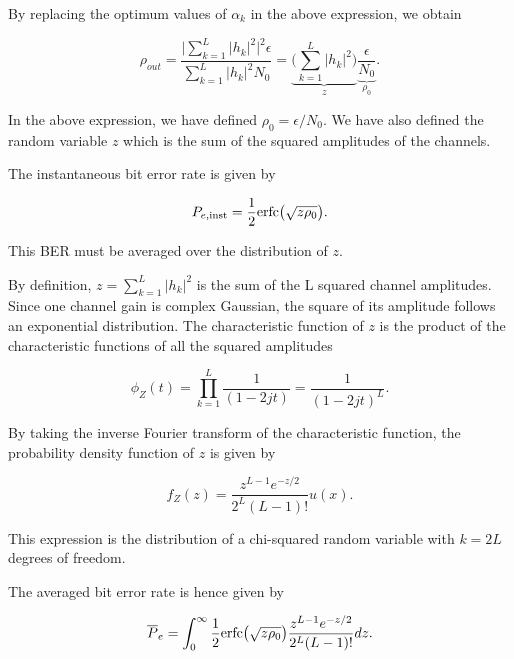 \documentclass [a4paper, 11pt] {article}
\begin{document}
\begin{solution}
\begin{enumerate}
    By replacing the optimum values of $\alpha_k$ in the above expression, we obtain

        \begin{equation}
        \rho_{out} = \dfrac{\Big| \sum_{k=1}^{L}|h_k|^2 \Big|^2 \epsilon}{\sum_{k=1}^{L} |h_k|^2N_0} = \underbrace{\bigg( \sum_{k=1}^{L} |h_k|^2 \bigg)}_{z} \underbrace{\dfrac{\epsilon}{N_0}}_{\rho_0}.
        \end{equation}

    In the above expression, we have defined $\rho_0 = \epsilon/N_0$. We have also defined the random variable $z$ which is the sum of the squared amplitudes of the channels.

    The instantaneous bit error rate is given by

    \begin{equation}
        P_{e,\text{\normalfont inst}}= \frac{1}{2}\text{\normalfont erfc}\big(\sqrt{z \rho_0}\big).
    \end{equation}

    This BER must be averaged over the distribution of $z$.

    By definition, $z = \sum_{k=1}^{L} |h_k|^2$ is the sum of the L squared channel amplitudes. Since one channel gain is complex Gaussian, the square of its amplitude follows an exponential distribution. The characteristic function of $z$ is the product of the characteristic functions of all the squared amplitudes

    \begin{equation}
        \phi_Z(t) = \prod_{k=1}^{L} \dfrac{1}{(1-2jt)} = \dfrac{1}{(1-2jt)^L}.
    \end{equation}

    By taking the inverse Fourier transform of the characteristic function, the probability density function of $z$ is given by

    \begin{equation}
        f_Z(z) = \frac{z^{L-1}e^{-z/2}}{2^L(L-1)!} u(x).
    \end{equation}

    This expression is the distribution of a chi-squared random variable with $k=2L$ degrees of freedom.

    The averaged bit error rate is hence given by

    \begin{equation}
    \overline{P}_e = \int_{0}^{\infty} \frac{1}{2}\text{\normalfont erfc}\big(\sqrt{z \rho_0}\big) \frac{z^{L-1}e^{-z/2}}{2^L(L-1)!} dz.
    \end{equation}


\end{enumerate}
\end{solution}
\end{document}
